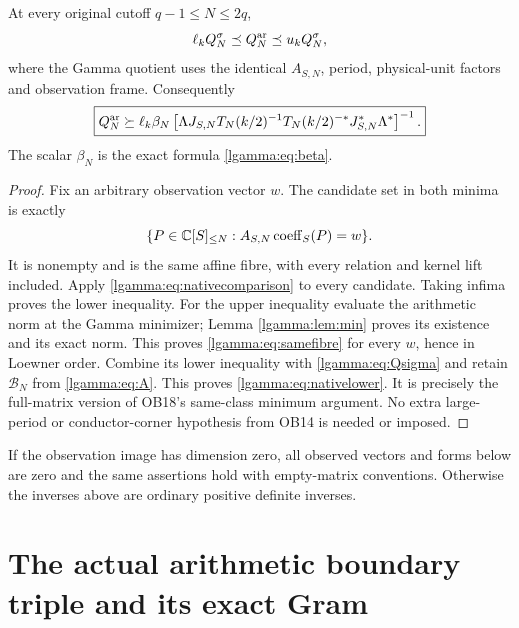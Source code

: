 \documentclass[11pt]{article}
\begin{document}
\begin{lgammatheorem}\label{lgamma:thm:nativelower}
At every original cutoff $q-1\le N\le2q$,
\begin{equation}\label{lgamma:eq:samefibre}
 \ell_kQ_N^\sigma\preceq Q_N^{\rm ar}\preceq u_kQ_N^\sigma,
\end{equation}
where the Gamma quotient uses the identical $A_{S,N}$, period,
physical-unit factors and observation frame.  Consequently
\begin{equation}\label{lgamma:eq:nativelower}
 \boxed{Q_N^{\rm ar}\succeq
 \ell_k\beta_N\left[
 \Lambda J_{S,N}T_N(k/2)^{-1}T_N(k/2)^{-*}J_{S,N}^*\Lambda^*
 \right]^{-1}.}
\end{equation}
The scalar $\beta_N$ is the exact formula \eqref{lgamma:eq:beta}.
\end{lgammatheorem}
\begin{proof}
Fix an arbitrary observation vector $w$.  The candidate set in both
minima is exactly
\[
 \{P\in\mathbb C[S]_{\le N}:A_{S,N}\operatorname{coeff}_S(P)=w\}.
\]
It is nonempty and is the same affine fibre, with every relation and
kernel lift included.  Apply \eqref{lgamma:eq:nativecomparison} to every
candidate.  Taking infima proves the lower inequality.  For the upper
inequality evaluate the arithmetic norm at the Gamma minimizer;
Lemma \ref{lgamma:lem:min} proves its existence and its exact norm.  This
proves \eqref{lgamma:eq:samefibre} for every $w$, hence in Loewner order.
Combine its lower inequality with \eqref{lgamma:eq:Qsigma} and retain
$\mathcal B_N$ from \eqref{lgamma:eq:A}.  This proves \eqref{lgamma:eq:nativelower}.
It is precisely the full-matrix version of OB18's same-class minimum
argument.  No extra large-period or conductor-corner hypothesis from
OB14 is needed or imposed.
\end{proof}

If the observation image has dimension zero, all observed vectors and
forms below are zero and the same assertions hold with empty-matrix
conventions.  Otherwise the inverses above are ordinary positive
definite inverses.

\section{The actual arithmetic boundary triple and its exact Gram}
\end{document}
